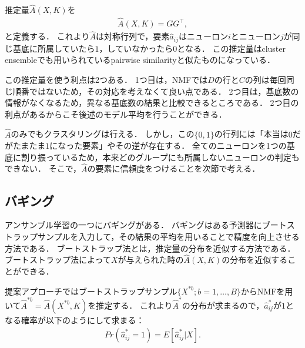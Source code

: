 推定量$\hat{A}(X,K)$を
\begin{align}
	\hat{A}(X,K) = G G^{\top},
\end{align}
と定義する．
これより$\hat{A}$は対称行列で，要素$\hat{a}_{ij}$はニューロン$i$とニューロン$j$が同じ基底に所属していたら$1$，していなかったら$0$となる．
この推定量はcluster ensembleでも用いられているpairwise similarity\cite{Boongoen2018}と似たものになっている．

この推定量を使う利点は2つある．
1つ目は，NMFでは$D$の行と$C$の列は毎回同じ順番ではないため，その対応を考えなくて良い点である．
2つ目は，基底数の情報がなくなるため，異なる基底数の結果と比較できるところである．
2つ目の利点があるからこそ後述のモデル平均を行うことができる．

$\hat{A}$のみでもクラスタリングは行える．
しかし，この$\{0,1\}$の行列には「本当は$0$だがたまたま$1$になった要素」やその逆が存在する．
全てのニューロンを1つの基底に割り振っているため，本来どのグループにも所属しないニューロンの判定もできない．
そこで，$\hat{A}$の要素に信頼度をつけることを次節で考える．

\subsection{バギング}
アンサンブル学習の一つにバギング\cite{Breiman1996}がある．
バギングはある予測器にブートストラップサンプルを入力して，その結果の平均を用いることで精度を向上させる方法である．
ブートストラップ法\cite{Efron1979}とは，推定量の分布を近似する方法である．
ブートストラップ法によって$X$が与えられた時の$\hat{A}(X,K)$の分布を近似することができる．

提案アプローチではブートストラップサンプル$\{X^{*b}; b = 1, \dots, B\}$からNMFを用いて$\hat{A}^{*b} = \hat{A}(X^{*b},K)$を推定する．
これより$\hat{A}^*$の分布が求まるので，$\hat{a}^*_{ij}$が$1$となる確率が以下のようにして求まる：
\begin{align}
	Pr(\hat{a}^*_{ij} = 1) = E[\hat{a}^*_{ij}|X].
\end{align}


